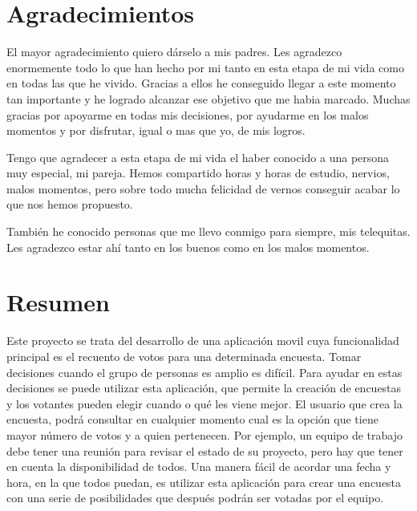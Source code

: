 \documentclass[a4paper, 12pt]{book}
\begin{document}

\chapter*{Agradecimientos}

El mayor agradecimiento quiero d\'arselo a mis padres. Les agradezco enormemente
todo lo que han hecho por mi tanto en esta etapa de mi vida como en todas las que he vivido. Gracias a ellos he conseguido
llegar a este momento tan importante y he logrado alcanzar ese objetivo que me habia marcado.
Muchas gracias por apoyarme en todas mis decisiones, por ayudarme en los malos momentos
y por disfrutar, igual o mas que yo, de mis logros.

Tengo que agradecer a esta etapa de mi vida el haber conocido a una persona muy especial, mi pareja. Hemos compartido 
horas y horas de estudio, nervios, malos momentos, pero sobre todo mucha felicidad de vernos conseguir acabar lo que
nos hemos propuesto.

Tambi\'en he conocido personas que me llevo conmigo para siempre, mis telequitas. Les agradezco estar ah\'i tanto en los buenos
como en los malos momentos.



\chapter*{Resumen}

Este proyecto se trata del desarrollo de una aplicaci\'on movil cuya funcionalidad principal es el recuento de votos para una determinada encuesta. Tomar decisiones cuando el grupo de personas es amplio es dif\'icil. Para ayudar en estas decisiones se puede utilizar esta aplicaci\'on, que permite la creaci\'on de encuestas y los votantes pueden elegir cuando o qu\'e les viene mejor. El usuario que crea la encuesta, podr\'a consultar en cualquier momento cual es la opci\'on que tiene mayor n\'umero de votos y a quien pertenecen. Por ejemplo, un equipo de trabajo debe tener una reuni\'on para revisar el estado de su proyecto, pero hay que tener en cuenta la disponibilidad de todos. Una manera f\'acil de acordar una fecha y hora, en la que todos puedan, es utilizar esta aplicaci\'on para crear una encuesta con una serie de posibilidades que despu\'es podr\'an ser votadas por el equipo.
\end{document}
